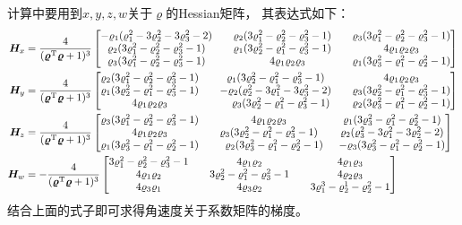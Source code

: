 计算中要用到$x, y, z, w$关于$\bm{\varrho}$的Hessian矩阵，
其表达式如下：
\begin{align}
    \bm{H}_x &= \frac{4}{\den}
    \begin{bmatrix}
        -\rk{1}\nummone \quad & \rk{2}\numone \quad & \rk{3}\numone \\ 
        \rk{2}\numone \quad & \rk{1}\numtwo \quad & 4\rk{1}\rk{2}\rk{3} \\
        \rk{3}\numone \quad & 4\rk{1}\rk{2}\rk{3} & \rk{1}\numthr 
    \end{bmatrix} \\
    \bm{H}_y &= \frac{4}{\den}
    \begin{bmatrix}
        \rk{2}\numone \quad & \rk{1}\numtwo \quad & 4\rk{1}\rk{2}\rk{3} \\ 
        \rk{1}\numtwo \quad & -\rk{2}\nummtwo \quad & \rk{3}\numtwo \\
        4\rk{1}\rk{2}\rk{3} \quad & \rk{3}\numtwo & \rk{2}\numthr 
    \end{bmatrix} \\ 
    \bm{H}_z &= \frac{4}{\den} 
    \begin{bmatrix}
        \rk{3}\numone \quad & 4\rk{1}\rk{2}\rk{3} \quad & \rk{1}\numthr \\ 
        4\rk{1}\rk{2}\rk{3} \quad & \rk{3}\numtwo \quad & \rk{2}\nummthr \\
        \rk{1}\numthr \quad & \rk{2}\numthr & -\rk{3}\numthr 
    \end{bmatrix} \\ 
    \bm{H}_w &= -\frac{4}{\den} 
    \begin{bmatrix}
        3\varrho_1^2-\varrho_2^2-\varrho_3^2-1 \quad &  4\rk{1}\rk{2} \quad & 4\rk{1}\rk{3} \\
        4\rk{1}\rk{2} \quad & 3\varrho_2^2-\varrho_1^2-\varrho_3^2-1 \quad & 4\rk{2}\rk{3} \\ 
        4\rk{3}\rk{1} \quad & 4\rk{3}\rk{2} \quad & 3\varrho_1^3-\varrho_2^1-\varrho_2^2-1
    \end{bmatrix}
\end{align}
结合上面的式子即可求得角速度关于系数矩阵的梯度。

